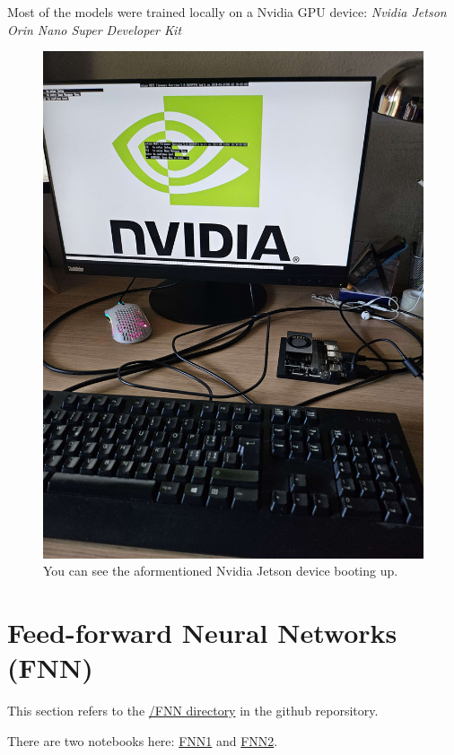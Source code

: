 \documentclass{article}
\begin{document}
Most of the models were trained locally on a Nvidia GPU device: \textit{Nvidia 
Jetson Orin Nano Super Developer Kit}

\begin{figure}[ht]
    \centering
    \includegraphics[width=0.5\paperwidth]{images/JetsonBoot.jpg}
    \caption{You can see the aformentioned Nvidia Jetson device booting up.}
    \label{fig:JetsonBoot}
\end{figure}

\newpage
\tableofcontents
\newpage

\section{Feed-forward Neural Networks (FNN)}
This section refers to the \href{https://github.com/AntonStantan/matura/tree/main/FNN}
{/FNN directory} in the github reporsitory.

There are two notebooks here: \href{https://github.com/AntonStantan/matura/blob/main/FNN/FNN1.ipynb}
{FNN1} and \href{https://github.com/AntonStantan/matura/blob/main/FNN/FNN2.ipynb}
{FNN2}.
\end{document}
